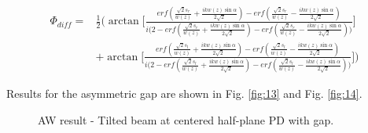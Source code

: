 \documentclass[aps,twoside,secnumarabic,balancelastpage,amsmath,amssymb,nofootinbib,hyperref=pdftex]{revtex4}
\begin{document}
\begin{align*}
\Phi_{diff} =&
\frac{1}{2}
\Big(
\arctan 
\Big[
    \frac
    {
        erf
        (
            \frac{\sqrt{2} s_r}{w(z)}
            +
            \frac{ikw(z) \sin \alpha}{2 \sqrt{2}}
        )
        -
        erf
        (
            \frac{\sqrt{2} s_r}{w(z)}
            -
            \frac{ikw(z) \sin \alpha}{2 \sqrt{2}}
        )
    }
    { 
        i
        \Big(
            2 - erf
                (
                    \frac{\sqrt{2} s_r}{w(z)}
                    +
                    \frac{i kw(z) \sin \alpha}{2 \sqrt{2}}
                 )
             -
             erf
                 (
                     \frac{\sqrt{2} s_r}{w(z)}
                     -
                     \frac{ikw(z) \sin \alpha}{2 \sqrt{2}}
                 )
        \Big)
    } 
\Big]
\\&+ 
\arctan
\Big[
    \frac
    {
        erf
        (
            \frac{\sqrt{2} s_l}{w(z)}
            +
            \frac{ikw(z) \sin \alpha}{2 \sqrt{2}}
        )
        -
        erf
        (
            \frac{\sqrt{2} s_l}{w(z)}
            -
            \frac{ikw(z) \sin \alpha}{2 \sqrt{2}}
        )
    }
    { 
        i
        \Big(
            2 - erf
                (
                    \frac{\sqrt{2} s_l}{w(z)}
                    +
                    \frac{i kw(z) \sin \alpha}{2 \sqrt{2}}
                 )
             -
             erf
                 (
                     \frac{\sqrt{2} s_l}{w(z)}
                     -
                     \frac{ikw(z) \sin \alpha}{2 \sqrt{2}}
                 )
        \Big)
    } 
\Big]
\Big)
\end{align*}

Results for the asymmetric gap are shown in Fig. \ref{fig:13} and Fig. \ref{fig:14}.

\clearpage

	\begin{figure}
	\centering
	\caption{AW result - Tilted beam at centered half-plane PD with gap.}
	\label{fig:11}
	\end{figure}
	
\end{document}
